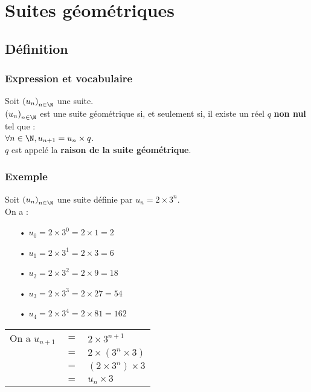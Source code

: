 \section{Suites géométriques}

\subsection{Définition}

\subsubsection{Expression et vocabulaire}

Soit $\left(u_n\right)_{n \in \N}$ une suite. \\

$\left(u_n\right)_{n \in \N}$ est une suite géométrique si, et seulement si, il existe un réel $q$ \textbf{non nul} tel que : \\
$\forall n \in \N, u_{n+1} = u_n \times q$. \\

$q$ est appelé la \textbf{raison de la suite géométrique}. 

\subsubsection{Exemple}
Soit $\left(u_n\right)_{n \in \N}$ une suite définie par $u_n = 2 \times 3^n$. \\

On a : 

\begin{itemize}
\item[•] $u_0 = 2 \times 3^0 = 2 \times 1 = 2$
\item[•] $u_1 = 2 \times 3^1 = 2 \times 3 = 6$
\item[•] $u_2 = 2 \times 3^2 = 2 \times 9 = 18$
\item[•] $u_3 = 2 \times 3^3 = 2 \times 27 = 54$
\item[•] $u_4 = 2 \times 3^4 = 2 \times 81 = 162$
\end{itemize}

\vspace*{.3cm}

\begin{tabular}{lll}
On a $u_{n+1}$ & $ = $ & $ 2 \times 3^{n+1}$ \\
& $=$ & $2 \times \left(3^n \times 3\right)$ \\
& $=$ & $\left(2 \times 3^n\right) \times 3$ \\
& $=$ & $u_n \times 3$ \\
\end{tabular}

